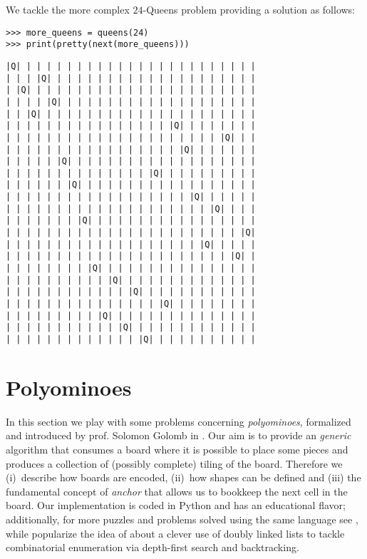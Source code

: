 \begin{example}
We tackle the more complex $24$-Queens problem providing a
solution as follows:
\begin{verbatim}
>>> more_queens = queens(24)
>>> print(pretty(next(more_queens)))
\end{verbatim}
\begin{Verbatim}[baselinestretch=0.1]
|Q| | | | | | | | | | | | | | | | | | | | | | | |
| | | |Q| | | | | | | | | | | | | | | | | | | | |
| |Q| | | | | | | | | | | | | | | | | | | | | | |
| | | | |Q| | | | | | | | | | | | | | | | | | | |
| | |Q| | | | | | | | | | | | | | | | | | | | | |
| | | | | | | | | | | | | | | | |Q| | | | | | | |
| | | | | | | | | | | | | | | | | | | | | |Q| | |
| | | | | | | | | | | | | | | | | |Q| | | | | | |
| | | | | |Q| | | | | | | | | | | | | | | | | | |
| | | | | | | | | | | | | | |Q| | | | | | | | | |
| | | | | | |Q| | | | | | | | | | | | | | | | | |
| | | | | | | | | | | | | | | | | | |Q| | | | | |
| | | | | | | | | | | | | | | | | | | | |Q| | | |
| | | | | | | |Q| | | | | | | | | | | | | | | | |
| | | | | | | | | | | | | | | | | | | | | | | |Q|
| | | | | | | | | | | | | | | | | | | |Q| | | | |
| | | | | | | | | | | | | | | | | | | | | | |Q| |
| | | | | | | | |Q| | | | | | | | | | | | | | | |
| | | | | | | | | | |Q| | | | | | | | | | | | | |
| | | | | | | | | | | | |Q| | | | | | | | | | | |
| | | | | | | | | | | | | | | |Q| | | | | | | | |
| | | | | | | | | |Q| | | | | | | | | | | | | | |
| | | | | | | | | | | |Q| | | | | | | | | | | | |
| | | | | | | | | | | | | |Q| | | | | | | | | | |
\end{Verbatim}
\end{example}

\section{Polyominoes}

In this section we play with some problems concerning \textit{polyominoes},
formalized and introduced by prof. Solomon Golomb in \citep{Golomb:1996}.  Our
aim is to provide an \textit{generic} algorithm that consumes a board where it
is possible to place some pieces and produces a collection of (possibly
complete) tiling of the board. Therefore we (i)~describe how boards are
encoded, (ii)~how shapes can be defined and (iii) the fundamental concept of
\textit{anchor} that allows us to bookkeep the next  cell in the
board. Our implementation is coded in Python and has an educational flavor;
additionally, for more puzzles and problems solved using the same language see
\citep{Goodger:polyominoes}, while \citep{knuth:dancing:links} popularize the
idea of \citep{HITOTUMATU1979174} about a clever use of doubly linked lists to
tackle combinatorial enumeration via depth-first search and backtracking.

